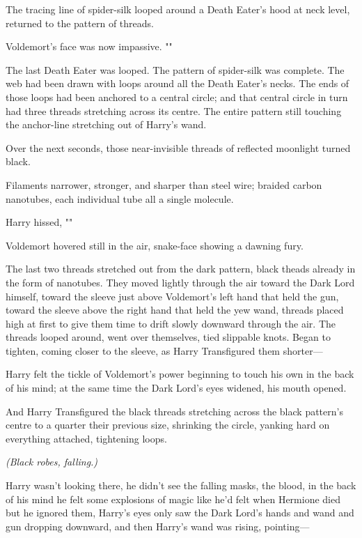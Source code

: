 The tracing line of spider-silk looped around a Death Eater's hood at neck
level, returned to the pattern of threads.

Voldemort's face was now impassive. ""

The last Death Eater was looped. The pattern of spider-silk was complete. The
web had been drawn with loops around all the Death Eater's necks. The ends of
those loops had been anchored to a central circle; and that central circle in
turn had three threads stretching across its centre. The entire pattern still
touching the anchor-line stretching out of Harry's wand.

Over the next seconds, those near-invisible threads of reflected moonlight
turned black.

Filaments narrower, stronger, and sharper than steel wire; braided carbon
nanotubes, each individual tube all a single molecule.

Harry hissed, ""

Voldemort hovered still in the air, snake-face showing a dawning fury.

The last two threads stretched out from the dark pattern, black theads already
in the form of nanotubes. They moved lightly through the air toward the Dark
Lord himself, toward the sleeve just above Voldemort's left hand that held the
gun, toward the sleeve above the right hand that held the yew wand, threads
placed high at first to give them time to drift slowly downward through the
air. The threads looped around, went over themselves, tied slippable knots.
Began to tighten, coming closer to the sleeve, as Harry Transfigured them
shorter---

Harry felt the tickle of Voldemort's power beginning to touch his own in the
back of his mind; at the same time the Dark Lord's eyes widened, his mouth
opened.

And Harry Transfigured the black threads stretching across the black pattern's
centre to a quarter their previous size, shrinking the circle, yanking hard on
everything attached, tightening loops.

\emph{(Black robes, falling.)}

Harry wasn't looking there, he didn't see the falling masks, the blood, in the
back of his mind he felt some explosions of magic like he'd felt when Hermione
died but he ignored them, Harry's eyes only saw the Dark Lord's hands and wand
and gun dropping downward, and then Harry's wand was rising, pointing---

